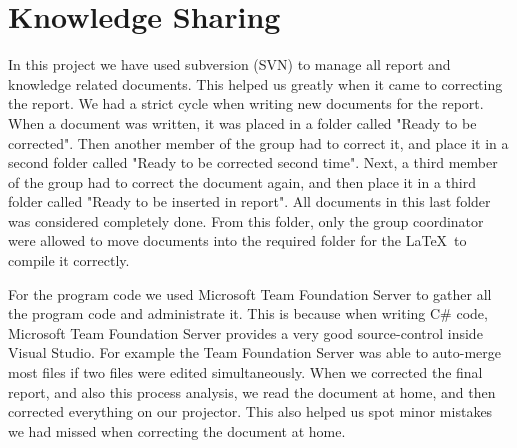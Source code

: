 \section{Knowledge Sharing}
In this project we have used subversion (SVN) to manage all report and knowledge related documents. This helped us greatly when it came to correcting the report. We had a strict cycle when writing new documents for the report. When a document was written, it was placed in a folder called "Ready to be corrected". Then another member of the group had to correct it, and place it in a second folder called "Ready to be corrected second time". Next, a third member of the group had to correct the document again, and then place it in a third folder called "Ready to be inserted in report". All documents in this last folder was considered completely done. From this folder, only the group coordinator were allowed to move documents into the required folder for the \LaTeX~to compile it correctly.

For the program code we used Microsoft Team Foundation Server to gather all the program code and administrate it. This is because when writing C\# code, Microsoft Team Foundation Server provides a very good source-control inside Visual Studio. For example the Team Foundation Server was able to auto-merge most files if two files were edited simultaneously. When we corrected the final report, and also this process analysis, we read the document at home, and then corrected everything on our projector. This also helped us spot minor mistakes we had missed when correcting the document at home.
